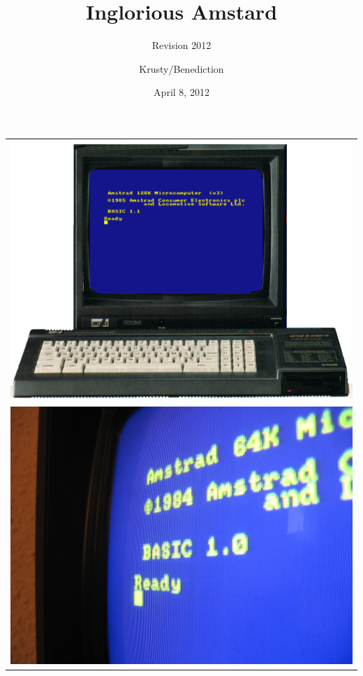 \documentclass{beamer}
\title{Inglorious Amstard}
\subtitle{Revision 2012}
\author{Krusty/Benediction}
\institute{CPC scene domination!}
\date{April 8, 2012}
\begin{document}
{
  {
  \begin{tabular}{c}
  \includegraphics[width=0.5\linewidth]{imgs/Amstrad_CPC_6128.png}\\
  \includegraphics[width=0.5\paperwidth]{imgs/Amstrad_CPC_screen_closeup.jpg}
\end{tabular}
  }

\begin{frame}
 \vspace{2cm}
    \begin{columns}
      \column{2.0in}
      \column{2.75in}
      \titlepage
     \vspace{10cm}
    \end{columns}
   \end{frame}
    }
\end{document}
